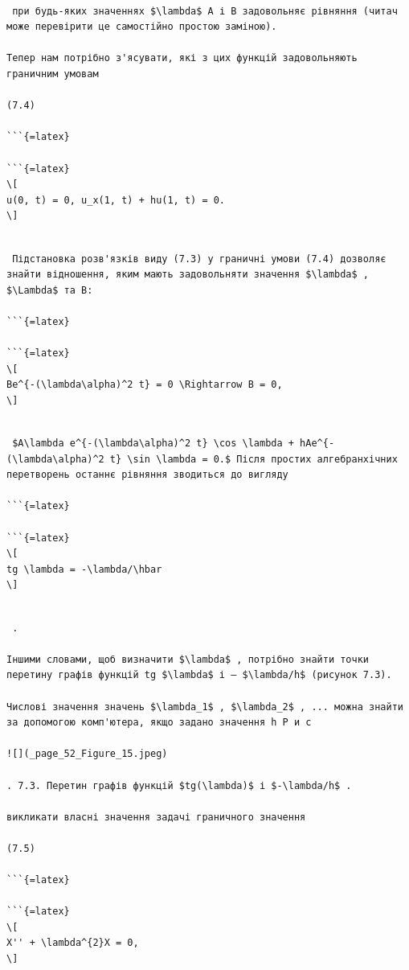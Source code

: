 \documentclass[
  ukrainian,
]{article}
\begin{document}
\begin{verbatim}

 при будь-яких значеннях $\lambda$ A і B задовольняє рівняння (читач може перевірити це самостійно простою заміною).

Тепер нам потрібно з'ясувати, які з цих функцій задовольняють граничним умовам

(7.4)

```{=latex}

```{=latex}
\[
u(0, t) = 0, u_x(1, t) + hu(1, t) = 0.
\]
\end{verbatim}

\begin{verbatim}

 Підстановка розв'язків виду (7.3) у граничні умови (7.4) дозволяє знайти відношення, яким мають задовольняти значення $\lambda$ , $\Lambda$ та B:

```{=latex}

```{=latex}
\[
Be^{-(\lambda\alpha)^2 t} = 0 \Rightarrow B = 0,
\]
\end{verbatim}

\begin{verbatim}

 $A\lambda e^{-(\lambda\alpha)^2 t} \cos \lambda + hAe^{-(\lambda\alpha)^2 t} \sin \lambda = 0.$ Після простих алгебранхічних перетворень останнє рівняння зводиться до вигляду

```{=latex}

```{=latex}
\[
tg \lambda = -\lambda/\hbar
\]
\end{verbatim}

\begin{verbatim}

 .

Іншими словами, щоб визначити $\lambda$ , потрібно знайти точки перетину графів функцій tg $\lambda$ і — $\lambda/h$ (рисунок 7.3).

Числові значення значень $\lambda_1$ , $\lambda_2$ , ... можна знайти за допомогою комп'ютера, якщо задано значення h Р и с

![](_page_52_Figure_15.jpeg)

. 7.3. Перетин графів функцій $tg(\lambda)$ і $-\lambda/h$ .

викликати власні значення задачі граничного значення

(7.5)

```{=latex}

```{=latex}
\[
X'' + \lambda^{2}X = 0,
\]
\end{verbatim}
\end{document}
